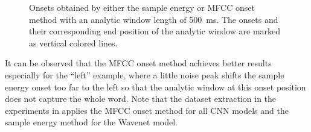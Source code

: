 \begin{figure}[!ht]
  \centering
    \quad
    \quad
  \caption{Onsets obtained by either the sample energy or MFCC onset method with an analytic window length of \SI{500}{\milli\second}. The onsets and their corresponding end position of the analytic window are marked as vertical colored lines.}
  \label{fig:signal_onset_showcase}
\end{figure}
\FloatBarrier
\noindent
It can be observed that the MFCC onset method achieves better results especially for the \enquote{left} example, where a little noise peak shifts the sample energy onset too far to the left so that the analytic window at this onset position does not capture the whole word.
Note that the dataset extraction in the experiments in  applies the MFCC onset method for all CNN models and the sample energy method for the Wavenet model.


